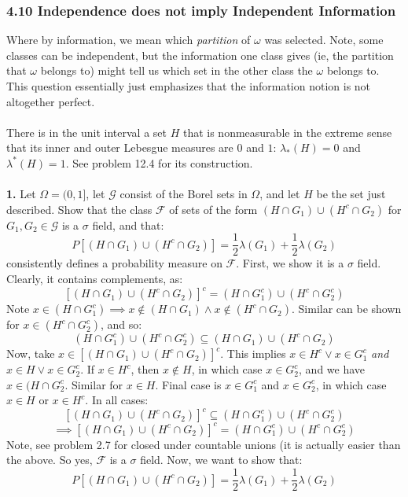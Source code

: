 \documentclass[12pt,a4paper]{article}
\newcommand{\1}[1]{\mathbbm{1}\left\{ #1 \right\}}
\newcommand{\fcal}{\mathcal{F}}
\newcommand{\gcal}{\mathcal{G}}
\begin{document}
\subsubsection{4.10 Independence does not imply Independent Information} Where by information, we mean which \textit{partition} of $\omega$ was selected. Note, some classes can be independent, but the information one class gives (ie, the partition that $\omega$ belongs to) might tell us which set in the other class the $\omega$ belongs to. This question essentially just emphasizes that the information notion is not altogether perfect.
\\\\
There is in the unit interval a set $H$ that is nonmeasurable in the extreme sense that its inner and outer Lebesgue measures are $0$ and $1$: $\lambda_*(H) = 0$ and $\lambda^*(H) = 1$. See problem 12.4 for its construction.
\\\\
\textbf{1.} Let $\Omega = (0,1]$, let $\gcal$ consist of the Borel sets in $\Omega$, and let $H$ be the set just described. Show that the class $\fcal$ of sets of the form $(H \cap G_1) \cup (H^c \cap G_2)$ for $G_1,G_2 \in \gcal$ is a $\sigma$ field, and that:
$$
	P\left[(H \cap G_1) \cup (H^c \cap G_2)\right] = \frac{1}{2}\lambda(G_1) + \frac{1}{2}\lambda(G_2)
$$
consistently defines a probability measure on $\fcal$. First, we show it is a $\sigma$ field. Clearly, it contains complements, as:
$$
	\left[(H \cap G_1) \cup (H^c \cap G_2)\right]^c =
	(H \cap G_1^c) \cup (H^c \cap G_2^c)
$$
Note $x \in (H \cap G_1^c) \implies x \not\in (H \cap G_1) \land x \not\in (H^c \cap G_2)$. Similar can be shown for $x \in (H^c \cap G_2^c)$, and so:
$$
	(H \cap G_1^c) \cup (H^c \cap G_2^c) \subseteq (H \cap G_1) \cup (H^c \cap G_2)
$$ 
Now, take $x \in \left[(H \cap G_1) \cup (H^c \cap G_2)\right]^c$. This implies $x \in H^c \lor x \in G_1^c$ \textit{and} $x \in H \lor x \in G_2^c$. If $x \in H^c$, then $x \not\in H$, in which case $x \in G_2^c$, and we have $x \in (H \cap G_2^c$. Similar for $x \in H$. Final case is $x \in G_1^c$ and $x \in G_2^c$, in which case $x \in H$ or $x \in H^c$. In all cases:
$$
	\left[(H \cap G_1) \cup (H^c \cap G_2)\right]^c \subseteq
	(H \cap G_1^c) \cup (H^c \cap G_2^c) 
$$
$$
	\implies
	\left[(H \cap G_1) \cup (H^c \cap G_2)\right]^c =
	(H \cap G_1^c) \cup (H^c \cap G_2^c)
$$
Note, see problem 2.7 for closed under countable unions (it is actually easier than the above. So yes, $\fcal$ is a $\sigma$ field. Now, we want to show that:
$$
	P\left[(H \cap G_1) \cup (H^c \cap G_2)\right] = \frac{1}{2}\lambda(G_1) + \frac{1}{2}\lambda(G_2)
$$
\end{document}
